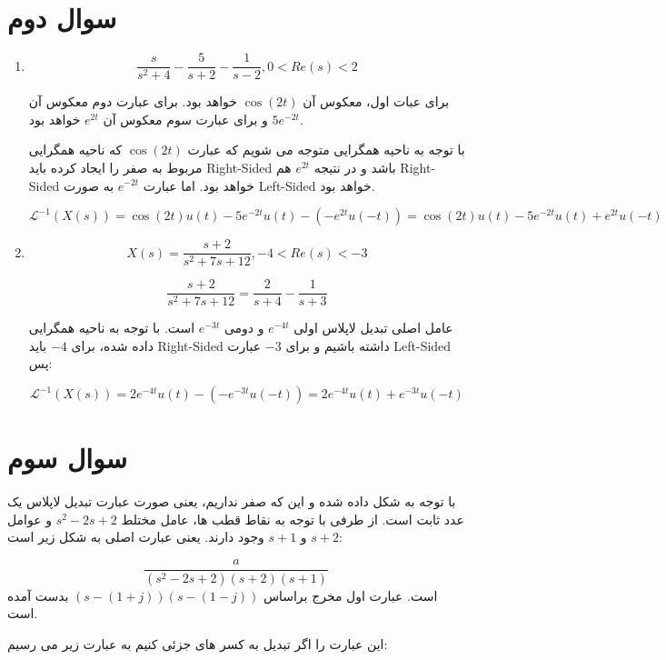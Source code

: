 \documentclass[12pt]{article}
\begin{document}
\section{سوال دوم}


\begin{enumerate}[label = \Alph*)]
	
	\item
$$
\frac{s}{s^{2}+4}-\frac{5}{s+2}-\frac{1}{s-2} , 0 < Re(s) < 2
$$

برای عبات اول، معکوس آن $\cos(2t)$ خواهد بود. برای عبارت دوم معکوس آن
$5 e^{-2t}$
و برای عبارت سوم معکوس آن
$e^{2t}$
خواهد بود.

با توجه به ناحیه همگرایی متوجه می شویم که عبارت $\cos(2t)$ که ناحیه همگرایی مربوط به صفر را ایجاد کرده باید Right-Sided باشد و در نتیجه $e^{2t}$ هم Right-Sided خواهد بود. اما عبارت $e^{-2t}$ به صورت Left-Sided خواهد بود.


	$$\mathcal{L}^{-1} (X(s))= \cos(2t) u(t) - 5 e^{-2t} u(t) - (- e^{2t} u(-t)) = \cos(2t) u(t) - 5 e^{-2t} u(t) + e^{2t} u(-t)$$


	
	\item
	
	$$
	X(s) =\frac{s+2}{s^{2}+7 s+12} , -4<Re(s)<-3
	$$
	
	$$
	\frac{s+2}{s^{2}+7 s+12} = \frac{2}{s+4} - \frac{1}{s+3}
	$$
	
	
	عامل اصلی تبدیل لاپلاس اولی $e^{-4t}$ و دومی $e^{-3t}$ است. با توجه به ناحیه همگرایی داده شده، برای $-4$ باید Right-Sided داشته باشیم و برای $-3$ عبارت Left-Sided پس:
	
	$$\mathcal{L}^{-1} (X(s))= 2 e^{-4t} u(t) - (- e^{-3t}u(-t)) = 2 e^{-4t} u(t) + e^{-3t}u(-t)$$
	
\end{enumerate}


\section{سوال سوم}

با توجه به شکل داده شده و این که صفر نداریم، یعنی صورت عبارت تبدیل لاپلاس یک عدد ثابت است.  از طرفی با توجه به نقاط قطب ها، عامل مختلط $s^2-2s+2$ و عوامل $s+2$ و $s+1$ وجود دارند. یعنی عبارت اصلی به شکل زیر است:

$$\frac{a}{(s^2-2s+2)(s+2)(s+1)}$$
است. عبارت اول مخرج براساس
$(s - (1+j))(s-(1-j))$
بدست آمده است.

این عبارت را اگر تبدیل به کسر های جزئی کنیم به عبارت زیر می رسیم:
\end{document}
